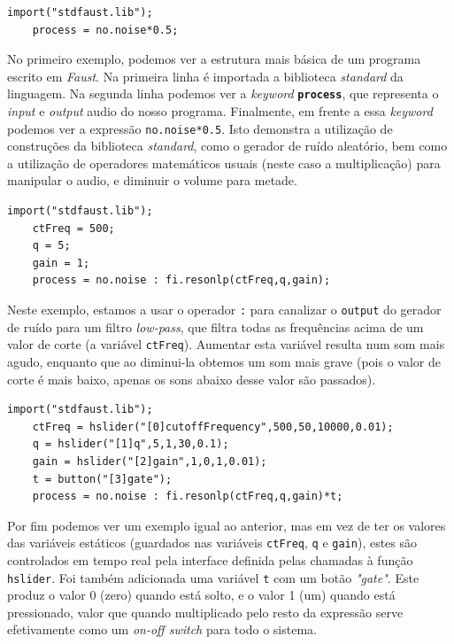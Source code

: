 \documentclass[
  oneside,
  11pt, a4paper,
  footinclude=true,
  headinclude=true,
  cleardoublepage=empty
]{scrbook}
\begin{document}
    \begin{lstlisting}[caption={Geração de ruído aleatório com volume a metade}]
    import("stdfaust.lib");
    process = no.noise*0.5;
    \end{lstlisting}
    
	No primeiro exemplo, podemos ver a estrutura mais básica de um programa escrito em \textit{Faust}. Na primeira linha é importada a biblioteca \textit{standard} da linguagem. Na segunda linha podemos ver a \textit{keyword} \textbf{\texttt{process}}, que representa o \textit{input} e \textit{output} audio do nosso programa. Finalmente, em frente a essa \textit{keyword} podemos ver a expressão \texttt{no.noise*0.5}. Isto demonstra a utilização de construções da biblioteca \textit{standard}, como o gerador de ruído aleatório, bem como a utilização de operadores matemáticos usuais (neste caso a multiplicação) para manipular o audio, e diminuir o volume para metade.
	
    \begin{lstlisting}[caption={Geração de ruído aleatório com um filtro \textit{low-pass}}]
    import("stdfaust.lib");
    ctFreq = 500;
    q = 5;
    gain = 1;
    process = no.noise : fi.resonlp(ctFreq,q,gain);
    \end{lstlisting}
    Neste exemplo, estamos a usar o operador \texttt{:} para canalizar o \texttt{output} do gerador de ruído para um filtro \textit{low-pass}, que filtra todas as frequências acima de um valor de corte (a variável \texttt{ctFreq}). Aumentar esta variável resulta num som mais agudo, enquanto que ao diminui-la obtemos um som mais grave (pois o valor de corte é mais baixo, apenas os sons abaixo desse valor são passados).
    
    \begin{lstlisting}[caption={Geração de ruído aleatório com um filtro \textit{low-pass} controlada por uma interface}]
    import("stdfaust.lib");
    ctFreq = hslider("[0]cutoffFrequency",500,50,10000,0.01);
    q = hslider("[1]q",5,1,30,0.1);
    gain = hslider("[2]gain",1,0,1,0.01);
    t = button("[3]gate");
    process = no.noise : fi.resonlp(ctFreq,q,gain)*t;
    \end{lstlisting}
    Por fim podemos ver um exemplo igual ao anterior, mas em vez de ter os valores das variáveis estáticos (guardados nas variáveis \texttt{ctFreq}, \texttt{q} e \texttt{gain}), estes são controlados em tempo real pela interface definida pelas chamadas à função \texttt{hslider}. Foi também adicionada uma variável \texttt{t} com um botão \textit{"gate"}. Este produz o valor 0 (zero) quando está solto, e o valor 1 (um) quando está pressionado, valor que quando multiplicado pelo resto da expressão serve efetivamente como um \textit{on-off switch} para todo o sistema.
    
\end{document}
